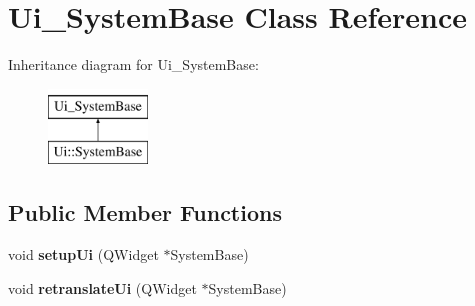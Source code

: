 \hypertarget{class_ui___system_base}{}\section{Ui\+\_\+\+System\+Base Class Reference}
\label{class_ui___system_base}
Inheritance diagram for Ui\+\_\+\+System\+Base\+:\begin{figure}[H]
\begin{center}
\leavevmode
\includegraphics[height=2.000000cm]{class_ui___system_base}
\end{center}
\end{figure}
\subsection*{Public Member Functions}
\begin{DoxyCompactItemize}
\item 
\mbox{\label{class_ui___system_base_a64441d34a29468ac6b80327957776b27}} 
void {\bfseries setup\+Ui} (Q\+Widget $\ast$System\+Base)
\item 
\mbox{\label{class_ui___system_base_a83cc0e86a5aebb6fdb2e9d12b4dccbfc}} 
void {\bfseries retranslate\+Ui} (Q\+Widget $\ast$System\+Base)
\end{DoxyCompactItemize}
